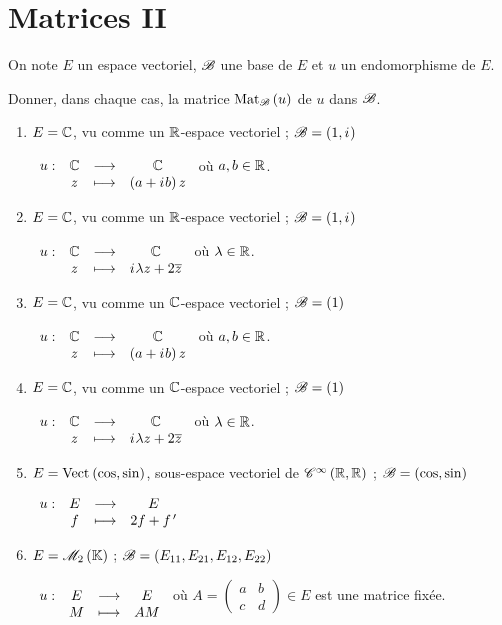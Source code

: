 \chapter{Matrices II}

\minitoc

\begin{exo}
On note \(E\) un espace vectoriel, \(\fami{B}\) une base de \(E\) et \(u\) un endomorphisme de \(E\).

Donner, dans chaque cas, la matrice \(\Mat{u}\) de \(u\) dans \(\fami{B}\).

\begin{enumerate}
\item \(E=\C\), vu comme un \(\R\)-espace vectoriel ; \(\fami{B}=\paren{1,\i}\)

\(\fonction{u}{\C}{\C}{z}{\paren{a+\i b}z}\) où \(a,b\in\R\). \\

\item \(E=\C\), vu comme un \(\R\)-espace vectoriel ; \(\fami{B}=\paren{1,\i}\)

\(\fonction{u}{\C}{\C}{z}{\i\lambda z+2\conj{z}}\) où \(\lambda\in\R\). \\

\item \(E=\C\), vu comme un \(\C\)-espace vectoriel ; \(\fami{B}=\paren{1}\)

\(\fonction{u}{\C}{\C}{z}{\paren{a+\i b}z}\) où \(a,b\in\R\). \\

\item \(E=\C\), vu comme un \(\C\)-espace vectoriel ; \(\fami{B}=\paren{1}\)

\(\fonction{u}{\C}{\C}{z}{\i\lambda z+2\conj{z}}\) où \(\lambda\in\R\). \\

\item \(E=\Vect{\cos,\sin}\), sous-espace vectoriel de \(\ensclasse{\infty}{\R}{\R}\) ; \(\fami{B}=\paren{\cos,\sin}\)

\(\fonction{u}{E}{E}{f}{2f+f\prim}\) \\

\item \(E=\M{2}\) ; \(\fami{B}=\paren{E_{11},E_{21},E_{12},E_{22}}\)

\(\fonction{u}{E}{E}{M}{AM}\) où \(A=\begin{pmatrix}
a & b \\
c & d
\end{pmatrix}\in E\) est une matrice fixée. \\


\end{enumerate}
\end{exo}
